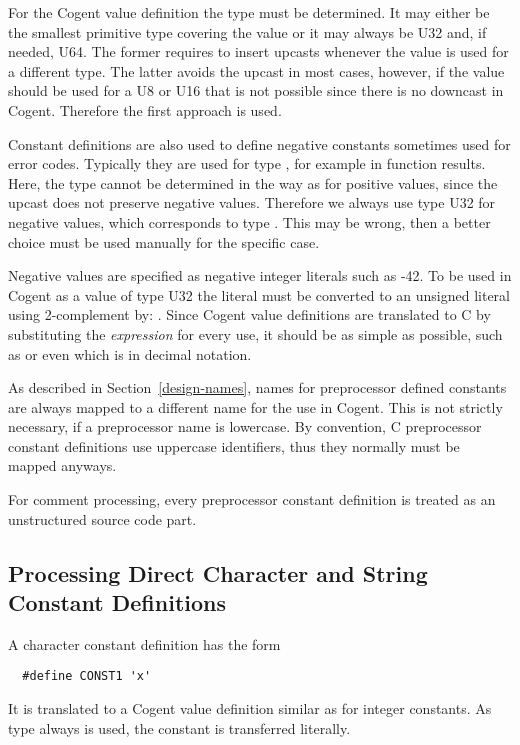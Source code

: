 For the Cogent value definition the type must be determined. It may either be the smallest primitive type covering the value 
or it may always be U32 and, if needed, U64. The former requires to insert upcasts whenever the value is used for a different 
type. The latter avoids the upcast in most cases, however, if the value should be used for a U8 or U16 that is not possible 
since there is no downcast in Cogent. Therefore the first approach is used.

Constant definitions are also used to define negative constants sometimes used for error codes. Typically they are used for 
type , for example in function results. Here, the type cannot be determined in the way as for positive values, since the 
upcast does not preserve negative values. Therefore we always use type U32 for negative values, which corresponds to type 
. This may be wrong, then a better choice must be used manually for the specific case.

Negative values are specified as negative integer literals such as -42. To be used in 
Cogent as a value of type U32 the literal must be converted to an unsigned literal using 2-complement by: 
.
Since Cogent value definitions are translated to C by substituting the \textit{expression} for every use, it should be as 
simple as possible, such as  or even  which is  in decimal notation.

As described in Section~\ref{design-names}, names for preprocessor defined constants are always mapped to a different
name for the use in Cogent. This is not strictly necessary, if a preprocessor name is lowercase. By convention, C preprocessor 
constant definitions use uppercase identifiers, thus they normally must be mapped anyways.

For comment processing, every preprocessor constant definition is treated as an unstructured source code part.

\subsection{Processing Direct Character and String Constant Definitions}

A character constant definition has the form
\begin{verbatim}
  #define CONST1 'x'
\end{verbatim}
It is translated to a Cogent value definition similar as for integer constants. As type always 
is used, the constant is transferred literally.

